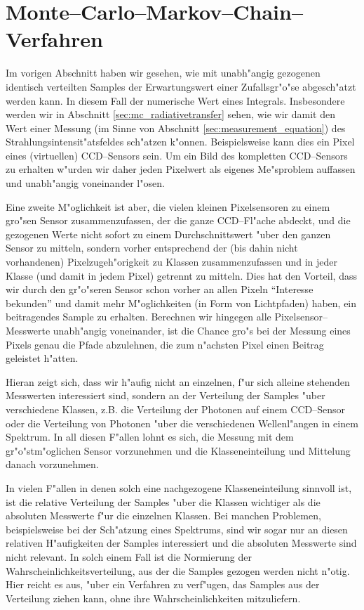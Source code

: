 	\chapter{Monte--Carlo--Markov--Chain--Verfahren}\label{chapter:mcmc}
	Im vorigen Abschnitt haben wir gesehen, wie mit unabh"angig gezogenen identisch verteilten Samples der Erwartungswert einer Zufallsgr"o"se abgesch"atzt werden kann. In diesem Fall der numerische Wert eines Integrals. Insbesondere werden wir in Abschnitt \ref{sec:mc_radiativetransfer} sehen, wie wir damit den Wert einer Messung (im Sinne von Abschnitt \ref{sec:measurement_equation}) des Strahlungsintensit"atsfeldes sch"atzen k"onnen. Beispielsweise kann dies ein Pixel eines (virtuellen) CCD--Sensors sein. Um ein Bild des kompletten CCD--Sensors zu erhalten w"urden wir daher jeden Pixelwert als eigenes Me"sproblem auffassen und unabh"angig voneinander l"osen.
	
	Eine zweite M"oglichkeit ist aber, die vielen kleinen Pixelsensoren zu einem gro"sen Sensor zusammenzufassen, der die ganze CCD--Fl"ache abdeckt, und die gezogenen Werte nicht sofort zu einem Durchschnittswert "uber den ganzen Sensor zu mitteln, sondern vorher entsprechend der (bis dahin nicht vorhandenen) Pixelzugeh"origkeit zu Klassen zusammenzufassen und in jeder Klasse (und damit in jedem Pixel) getrennt zu mitteln. Dies hat den Vorteil, dass wir durch den gr"o"seren Sensor schon vorher an allen Pixeln ``Interesse bekunden'' und damit mehr M"oglichkeiten (in Form von Lichtpfaden) haben, ein beitragendes Sample zu erhalten. Berechnen wir hingegen alle Pixelsensor--Messwerte unabh"angig voneinander, ist die Chance gro"s bei der Messung eines Pixels genau die Pfade abzulehnen, die zum n"achsten Pixel einen Beitrag geleistet h"atten.
	
	Hieran zeigt sich, dass wir h"aufig nicht an einzelnen, f"ur sich alleine stehenden Messwerten interessiert sind, sondern an der Verteilung der Samples "uber verschiedene Klassen, z.B. die Verteilung der Photonen auf einem CCD--Sensor oder die Verteilung von Photonen "uber die verschiedenen Wellenl"angen in einem Spektrum. In all diesen F"allen lohnt es sich, die Messung mit dem gr"o"stm"oglichen Sensor vorzunehmen und die Klasseneinteilung und Mittelung danach vorzunehmen.

	In vielen F"allen in denen solch eine nachgezogene Klasseneinteilung sinnvoll ist, ist die relative Verteilung der Samples "uber die Klassen wichtiger als die absoluten Messwerte f"ur die einzelnen Klassen. Bei manchen Problemen, beispielsweise bei der Sch"atzung eines Spektrums, sind wir sogar nur an diesen relativen H"aufigkeiten der Samples interessiert und die absoluten Messwerte sind nicht relevant. In solch einem Fall ist die Normierung der Wahrscheinlichkeitsverteilung, aus der die Samples gezogen werden nicht n"otig. Hier reicht es aus, "uber ein Verfahren zu verf"ugen, das Samples aus der Verteilung ziehen kann, ohne ihre Wahrscheinlichkeiten mitzuliefern.
	
